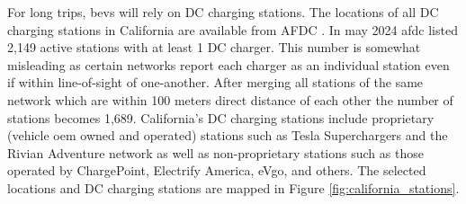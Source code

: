 \documentclass[11pt]{article}
\begin{document}
\begin{multicols}{2}
For long trips, \glspl{bev} will rely on DC charging stations. The locations of all DC charging stations in California are available from AFDC \cite{afdc_2023}. In may 2024 \gls{afdc} listed 2,149 active stations with at least 1 DC charger. This number is somewhat misleading as certain networks report each charger as an individual station even if within line-of-sight of one-another. After merging all stations of the same network which are within 100 meters direct distance of each other the number of stations becomes 1,689. California's DC charging stations include proprietary (vehicle \gls{oem} owned and operated) stations such as Tesla Superchargers and the Rivian Adventure network as well as non-proprietary stations such as those operated by ChargePoint, Electrify America, eVgo, and others. The selected locations and DC charging stations are mapped in Figure \ref{fig:california_stations}.

\end{multicols}
\end{document}
